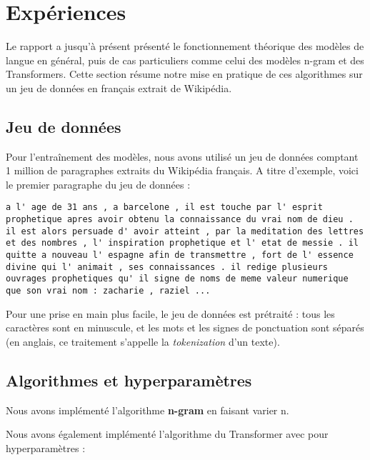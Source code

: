 \hypertarget{expuxe9riences}{%
\section{Expériences}\label{expuxe9riences}}

Le rapport a jusqu'à présent présenté le fonctionnement théorique des
modèles de langue en général, puis de cas particuliers comme celui des
modèles n-gram et des Transformers. Cette section résume notre mise en
pratique de ces algorithmes sur un jeu de données en français extrait de
Wikipédia.

\hypertarget{jeu-de-donnuxe9es}{%
\subsection{Jeu de données}\label{jeu-de-donnuxe9es}}

Pour l'entraînement des modèles, nous avons utilisé un jeu de données
comptant 1 million de paragraphes extraits du Wikipédia français. A
titre d'exemple, voici le premier paragraphe du jeu de données :

\begin{verbatim}
a l' age de 31 ans , a barcelone , il est touche par l' esprit prophetique apres avoir obtenu la connaissance du vrai nom de dieu . il est alors persuade d' avoir atteint , par la meditation des lettres et des nombres , l' inspiration prophetique et l' etat de messie . il quitte a nouveau l' espagne afin de transmettre , fort de l' essence divine qui l' animait , ses connaissances . il redige plusieurs ouvrages prophetiques qu' il signe de noms de meme valeur numerique que son vrai nom : zacharie , raziel ...
\end{verbatim}

Pour une prise en main plus facile, le jeu de données est prétraité :
tous les caractères sont en minuscule, et les mots et les signes de
ponctuation sont séparés (en anglais, ce traitement s'appelle la
\emph{tokenization} d'un texte).

\hypertarget{algorithmes-et-hyperparamuxe8tres}{%
\subsection{Algorithmes et
hyperparamètres}\label{algorithmes-et-hyperparamuxe8tres}}

Nous avons implémenté l'algorithme \textbf{n-gram} en faisant varier n.

Nous avons également implémenté l'algorithme du Transformer avec pour
hyperparamètres :

